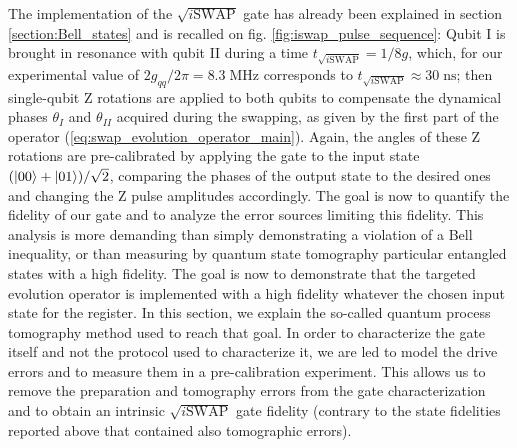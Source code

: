 The implementation of the $\sqrt{i\mathrm{SWAP}}$ gate has already been explained in section \ref{section:Bell_states} and is recalled on fig. \ref{fig:iswap_pulse_sequence}: Qubit I is brought in resonance with qubit II during a time $t_{\sqrt{i\mathrm{SWAP}}}=1/8g$, which, for our experimental value of $2g_{qq}/2\pi = 8.3\;\mathrm{MHz}$ corresponds to $t_{\sqrt{i\mathrm{SWAP}}}\approx 30\;\mathrm{ns}$; then single-qubit Z rotations are applied to both qubits to compensate the dynamical phases $\theta_I$ and $\theta_{II}$ acquired during the swapping, as given by the first part of the operator (\ref{eq:swap_evolution_operator_main}). Again, the angles of these Z rotations are pre-calibrated by applying the gate to the input state $(\left| 00 \right>+\left| 01 \right>)/\sqrt{2}$, comparing the phases of the output state to the desired ones and changing the Z pulse amplitudes accordingly. The goal is now to quantify the fidelity of our gate and to analyze the error sources limiting this fidelity.	This analysis  is more demanding than simply demonstrating a violation of a Bell inequality, or than measuring by quantum state tomography particular entangled states with a high fidelity. The goal is now to demonstrate that the targeted evolution operator is implemented with a high fidelity whatever the chosen input state for the register. In this section, we explain the so-called quantum process tomography method used to reach that goal. In order to characterize the gate itself and not the protocol used to characterize it, we are led to model the drive errors and to measure them in a pre-calibration experiment. This allows us to remove the preparation and tomography errors from the gate characterization and to obtain an intrinsic $\sqrt{i\mathrm{SWAP}}$ gate fidelity (contrary to the state fidelities reported above that contained also tomographic errors).

